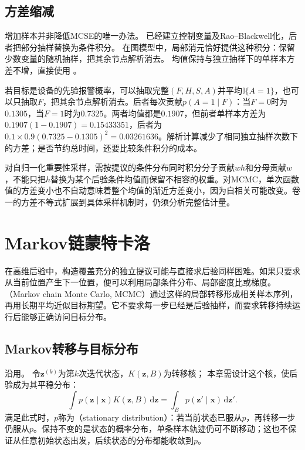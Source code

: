 \subsection{方差缩减}
\label{sec:pgm-sampling-variance-reduction}

增加样本并非降低MCSE的唯一办法。
已经建立控制变量及Rao--Blackwell化，后者把部分抽样替换为条件积分。
在图模型中，局部消元恰好提供这种积分：保留少数变量的随机抽样，把其余节点解析消去。
均值保持与独立抽样下的单样本方差不增，直接使用
。

若目标是设备的先验报警概率，可以抽取完整$(F,H,S,A)$并平均$\mathbb{I}\{A=1\}$，也可以只抽取$F$，把其余节点解析消去。后者每次贡献$p(A=1\mid F)$：当$F=0$时为$0.1305$，当$F=1$时为$0.7325$。两者均值都是$0.1907$，但前者单样本方差为$0.1907(1-0.1907)=0.15433351$，后者为$0.1\times0.9(0.7325-0.1305)^2=0.03261636$。解析计算减少了相同独立抽样次数下的方差；是否节约总时间，还要比较条件积分的成本。

对自归一化重要性采样，需按提议的条件分布同时积分分子贡献$wh$和分母贡献$w$，不能只把$h$替换为某个后验条件均值而保留不相容的权重。对MCMC，单次函数值的方差变小也不自动意味着整个均值的渐近方差变小，因为自相关可能改变。卷一的方差不等式扩展到具体采样机制时，仍须分析完整估计量。

\section{Markov链蒙特卡洛}
\label{sec:pgm-sampling-mcmc}

在高维后验中，构造覆盖充分的独立提议可能与直接求后验同样困难。如果只要求从当前位置产生下一位置，便可以利用局部条件分布、局部密度比或梯度。（Markov chain Monte Carlo, MCMC）通过这样的局部转移形成相关样本序列，再用长期平均近似目标期望。它不要求每一步已经是后验抽样，而要求转移持续运行后能够正确访问目标分布。

\subsection{Markov转移与目标分布}
\label{sec:pgm-sampling-markov-kernel}

沿用。
令$\bm z^{(k)}$为第$k$次迭代状态，$K(\bm z,B)$为转移核；
本章需设计这个核，使后验成为其平稳分布：
\begin{equation}
  \int p(\bm{z}\mid\bm{x})K(\bm{z},B)\,\mathrm{d}\bm{z}
    =\int_B p(\bm{z}'\mid\bm{x})\,\mathrm{d}\bm{z}'.
  \label{eq:pgm-sampling-invariance}
\end{equation}
满足此式时，$p$称为（stationary distribution）：若当前状态已服从$p$，再转移一步仍服从$p$。保持不变的是状态的概率分布，单条样本轨迹仍可不断移动；这也不保证从任意初始状态出发，后续状态的分布都能收敛到$p$。

